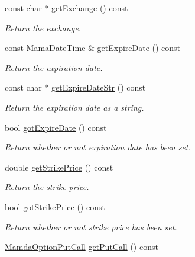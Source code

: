\begin{CompactItemize}
const char $\ast$ \hyperlink{classWombat_1_1MamdaOptionContract_776da4aca200db2a474a491f4dae6edb}{get\-Exchange} () const 
\begin{CompactList}\small\item\em Return the exchange. \item\end{CompactList}\item 
const Mama\-Date\-Time \& \hyperlink{classWombat_1_1MamdaOptionContract_0ff115c7e94c4125a8a4bf11a417f072}{get\-Expire\-Date} () const 
\begin{CompactList}\small\item\em Return the expiration date. \item\end{CompactList}\item 
const char $\ast$ \hyperlink{classWombat_1_1MamdaOptionContract_cb83dd5c1f8ceced6744ba3a44fc0d65}{get\-Expire\-Date\-Str} () const 
\begin{CompactList}\small\item\em Return the expiration date as a string. \item\end{CompactList}\item 
bool \hyperlink{classWombat_1_1MamdaOptionContract_8657f2b6fa3ce16032522a460e657387}{got\-Expire\-Date} () const 
\begin{CompactList}\small\item\em Return whether or not expiration date has been set. \item\end{CompactList}\item 
double \hyperlink{classWombat_1_1MamdaOptionContract_d9d9e836fab85c7b7dc0401020dd6f46}{get\-Strike\-Price} () const 
\begin{CompactList}\small\item\em Return the strike price. \item\end{CompactList}\item 
bool \hyperlink{classWombat_1_1MamdaOptionContract_798b5f3f11b9578349a6503b22e3c171}{got\-Strike\-Price} () const 
\begin{CompactList}\small\item\em Return whether or not strike price has been set. \item\end{CompactList}\item 
\hyperlink{namespaceWombat_ceb2ef77ec6c36b48ef57d2887d6ac49}{Mamda\-Option\-Put\-Call} \hyperlink{classWombat_1_1MamdaOptionContract_2cc67d660671ab468738e118cc3640ce}{get\-Put\-Call} () const 

\end{CompactItemize}
